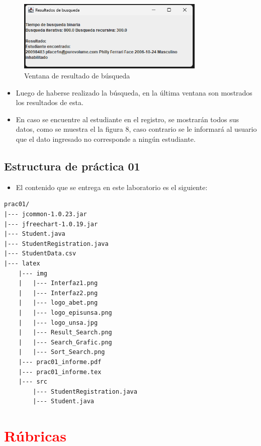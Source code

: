\documentclass{article}
\begin{document}
     \begin{figure}[H]
        \centering
	\includegraphics[width=0.8\textwidth,keepaspectratio]{img/Result_Search.png}
        \caption{Ventana de resultado de búsqueda}
    \end{figure}

    \begin{itemize}	
        \item Luego de haberse realizado la búsqueda, en la última ventana son mostrados los resultados de esta.
        \item En caso se encuentre al estudiante en el registro, se mostrarán todos sus datos, como se muestra el la figura 8, caso contrario se le informará al usuario que el dato ingresado no corresponde a ningún estudiante.
	\end{itemize}




 
	\subsection{Estructura de práctica 01}
	\begin{itemize}	
		\item El contenido que se entrega en este laboratorio es el siguiente:
	\end{itemize}
	
\begin{lstlisting}[style=ascii-tree]
prac01/
|--- jcommon-1.0.23.jar
|--- jfreechart-1.0.19.jar
|--- Student.java
|--- StudentRegistration.java
|--- StudentData.csv
|--- latex
    |--- img
    |   |--- Interfaz1.png
    |   |--- Interfaz2.png
    |   |--- logo_abet.png
    |   |--- logo_episunsa.png
    |   |--- logo_unsa.jpg
    |   |--- Result_Search.png
    |   |--- Search_Grafic.png
    |   |--- Sort_Search.png
    |--- prac01_informe.pdf    
    |--- prac01_informe.tex
    |--- src
        |--- StudentRegistration.java
        |--- Student.java
\end{lstlisting}    

	\section{\textcolor{red}{Rúbricas}}
	
\end{document}
